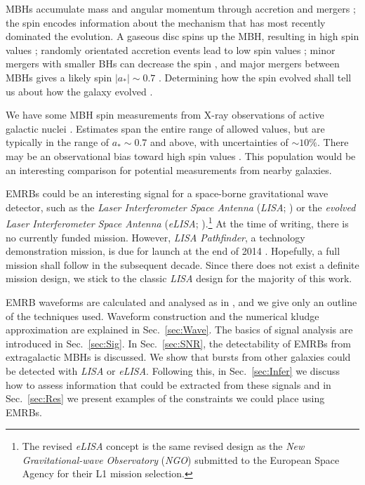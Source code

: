 \documentclass[useAMS,usedcolumn,usegraphicx,usenatbib]{mn2e}
\newcommand{\secref}[1]{Sec.~\ref{sec:#1}}
\begin{document}
MBHs accumulate mass and angular momentum through accretion and mergers \citep{Volonteri2010, Yu2002}; the spin encodes information about the mechanism that has most recently dominated the evolution. A gaseous disc spins up the MBH, resulting in high spin values \citep{Volonteri2005}; randomly orientated accretion events lead to low spin values \citep*{King2006, King2008}; minor mergers with smaller BHs can decrease the spin \citep*{Hughes2003, Gammie2004}, and major mergers between MBHs gives a likely spin $|a_\ast| \sim 0.7$ \citep{Berti2008, Gonzalez2007}. Determining how the spin evolved shall tell us about how the galaxy evolved \citep{Barausse2012}.

We have some MBH spin measurements from X-ray observations of active galactic nuclei \citep[e.g.][]{Walton2013}. Estimates span the entire range of allowed values, but are typically in the range of $a_\ast \sim 0.7$ and above, with uncertainties of $\sim 10\%$. There may be an observational bias toward high spin values \citep{Brenneman2011}. This population would be an interesting comparison for potential measurements from nearby galaxies. %

EMRBs could be an interesting signal for a space-borne gravitational wave detector, such as the \textit{Laser Interferometer Space Antenna} (\textit{LISA}; \citealt{Bender1998, Danzmann2003}) or the \textit{evolved Laser Interferometer Space Antenna} (\textit{eLISA}; \citealt{Jennrich2011, Amaro-Seoane2012a}).\footnote{The revised \textit{eLISA} concept is the same revised design as the \textit{New Gravitational-wave Observatory} (\textit{NGO}) submitted to the European Space Agency for their L1 mission selection.} At the time of writing, there is no currently funded mission. However, \textit{LISA Pathfinder}, a technology demonstration mission, is due for launch at the end of 2014 \citep{Anza2005, Antonucci2012}. Hopefully, a full mission shall follow in the subsequent decade. Since there does not exist a definite mission design, we stick to the classic \textit{LISA} design for the majority of this work.

EMRB waveforms are calculated and analysed as in \citet{Berry2013}, and we give only an outline of the techniques used. Waveform construction and the numerical kludge approximation are explained in \secref{Wave}. The basics of signal analysis are introduced in \secref{Sig}. In \secref{SNR}, the detectability of EMRBs from extragalactic MBHs is discussed. We show that bursts from other galaxies could be detected with \textit{LISA} or \textit{eLISA}. Following this, in \secref{Infer} we discuss how to assess information that could be extracted from these signals and in \secref{Res} we present examples of the constraints we could place using EMRBs.
\end{document}
